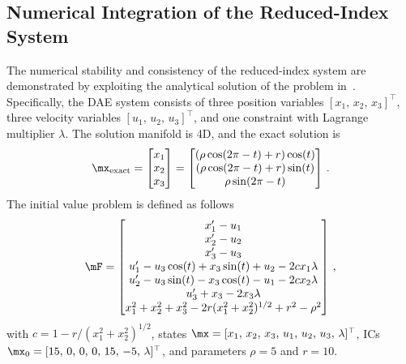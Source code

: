 \subsection{Numerical Integration of the Reduced-Index System}
\label{chap4:sec:numerical_integration}

The numerical stability and consistency of the reduced-index system are demonstrated by exploiting the analytical solution of the problem in~\cite{campbell1995constraint}. Specifically, the \ac{DAE} system consists of three position variables $[x_{1}, \, x_{2}, \, x_{3}]^\top$, three velocity variables $[u_{1}, \, u_{2}, \, u_{3}]^\top$, and one constraint with Lagrange multiplier $\lambda$. The solution manifold is 4D, and the exact solution is
%
\begin{equation*}
  \mx_\text{exact} = \begin{bmatrix}
    x_{1} \\ x_{2} \\ x_{3}
  \end{bmatrix} = \begin{bmatrix}
    (\rho \cos(2\pi - t) + r) \cos(t) \\
    (\rho \cos(2\pi - t) + r) \sin(t) \\
    \rho \sin(2\pi - t)
  \end{bmatrix} \, \text{.}
\end{equation*}
%
The initial value problem is defined as follows
%
\begin{equation}
  \label{chap4:eq:torus}
  \mF = \begin{bmatrix}
    x^{\prime}_{1} - u_{1} \\
    x^{\prime}_{2} - u_{2} \\
    x^{\prime}_{3} - u_{3} \\
    u^{\prime}_{1} - u_{3}\cos(t) + x_{3}\sin(t) + u_{2} - 2 c x_{1}\lambda \\
    u^{\prime}_{2} - u_{3}\sin(t) - x_{3}\cos(t) - u_{1} - 2 c x_{2}\lambda \\
    u^{\prime}_{3} + x_{3} - 2x_{3}\lambda \\
    x_{1}^2 + x_{2}^2 + x_{3}^2 - 2r(x_{1}^2 + x_{2}^2)^{1/2} + r^2 - \rho^2
  \end{bmatrix} \, \text{,}
\end{equation}
%
with $c = 1 - {r} / {(x_{1}^2 + x_{2}^2)^{1/2}}$, states $\mx = [x_{1}, \, x_{2}, \, x_{3}, \, u_{1}, \, u_{2}, \, u_{3}, \, \lambda]^{\top}$, \acp{IC} $\mx_{0} = [15, \, 0, \, 0, \, 0, \, 15, \, -5, \, \lambda]^{\top}$, and parameters $\rho = 5$ and $r = 10$.


